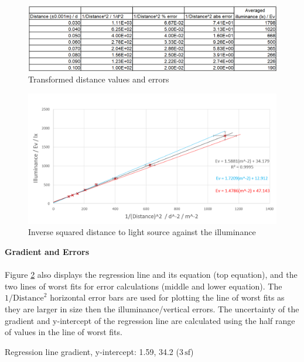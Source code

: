 \documentclass[a4paper,12pt]{article}
\newcommand{\tsf}{\,\text{sf}}
\newcommand{\paragraphnl}[1]{\textbf{#1}\\\\}
\begin{document}
\begin{figure}[H]
    \centering
    \includegraphics[width=\textwidth]{assets/transformdata.png}
    \caption{Transformed distance values and errors}
    \label{fig:tdata}
\end{figure}

\begin{figure}[H]
    \centering
    \includegraphics[width=\textwidth]{assets/transformgraph.png}
    \caption{Inverse squared distance to light source against the illuminance}
    \label{gph:tdata}
\end{figure}

\paragraphnl{Gradient and Errors}
Figure \ref{gph:tdata} also displays the regression line and its equation (top equation), and the two lines of worst fits for error calculations (middle and lower equation). The $1/\text{Distance}^2$ horizontal error bars are used for plotting the line of worst fits as they are larger in size then the illuminance/vertical errors. The uncertainty of the gradient and y-intercept of the regression line are calculated using the half range of values in the line of worst fits.


Regression line gradient, y-intercept: 1.59, 34.2 ($3 \tsf$)
\end{document}
